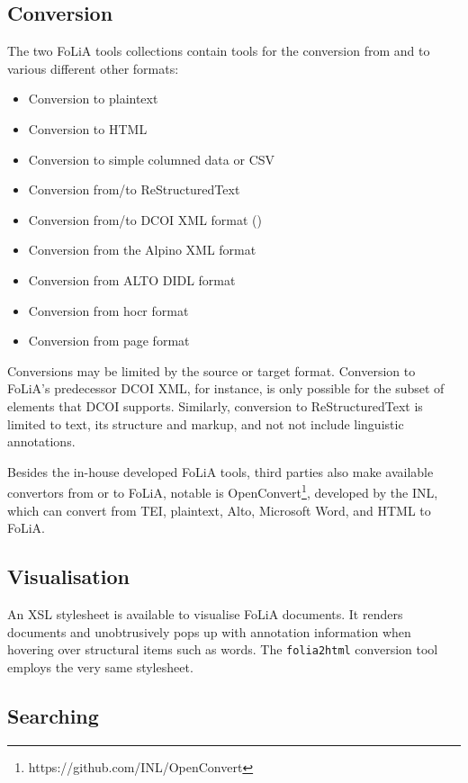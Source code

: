 \documentclass[a4paper,10pt,twoside]{article}
\begin{document}
\subsection{Conversion}

The two FoLiA tools collections contain tools for the conversion from and to
various different other formats:

\begin{itemize}
    \item Conversion to plaintext
    \item Conversion to HTML
    \item Conversion to simple columned data or CSV
    \item Conversion from/to ReStructuredText
    \item Conversion from/to DCOI XML format (\cite{DCOI})
    \item Conversion from the Alpino XML format
    \item Conversion from ALTO DIDL format %
    \item Conversion from hocr format  %
    \item Conversion from page format  %
\end{itemize}

Conversions may be limited by the source or target format. Conversion to
FoLiA's predecessor DCOI XML, for instance, is only possible for the subset of
elements that DCOI supports. Similarly, conversion to ReStructuredText is
limited to text, its structure and markup, and not not include linguistic
annotations.

Besides the in-house developed FoLiA tools, third parties also make available
convertors from or to FoLiA, notable is
OpenConvert\footnote{https://github.com/INL/OpenConvert}, developed by the INL,
which can convert from TEI, plaintext, Alto, Microsoft Word, and HTML to
FoLiA.

\subsection{Visualisation}

An XSL stylesheet is available to visualise FoLiA documents. It renders
documents and unobtrusively pops up with annotation information when hovering
over structural items such as words. The \texttt{folia2html} conversion tool
employs the very same stylesheet.

\subsection{Searching}
\end{document}
